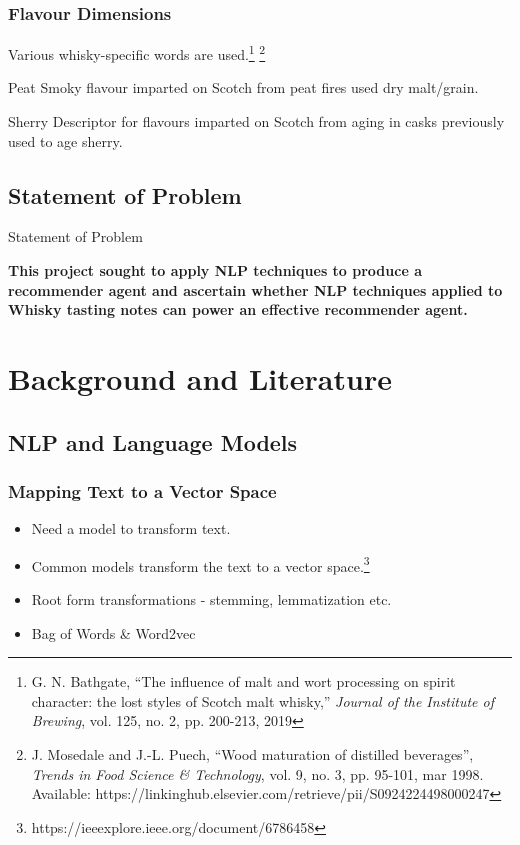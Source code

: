 \documentclass{beamer}
\begin{document}
\begin{frame}
    \frametitle{Flavour Dimensions}
    Various whisky-specific words are used.\footnote{
        G. N. Bathgate, ``The influence of malt and wort processing on spirit character: the lost styles of
    Scotch malt whisky,'' \emph{Journal of the Institute of Brewing}, vol. 125, no. 2, pp. 200-213, 2019}
    \footnote{J. Mosedale and J.-L. Puech, ``Wood maturation of distilled beverages'', \emph{Trends in
    Food Science \& Technology}, vol. 9, no. 3, pp. 95-101, mar 1998. Available:
    https://linkinghub.elsevier.com/retrieve/pii/S0924224498000247}
    
    \begin{block}{Peat}
    Smoky flavour imparted on Scotch from peat fires used dry malt/grain.
    \end{block}

    \begin{block}{Sherry}
    Descriptor for flavours imparted on Scotch from aging in casks previously used to age sherry.
    \end{block}
\end{frame}

\subsection{Statement of Problem}

\begin{frame}{Statement of Problem}

    \textbf{This project sought to apply NLP techniques to produce a recommender agent and ascertain whether
    NLP techniques applied to Whisky tasting notes can power an effective recommender agent.}
\end{frame}

\section{Background and Literature} 

\subsection{NLP and Language Models}

\begin{frame}
    \frametitle{Mapping Text to a Vector Space}
    \begin{itemize}
        \item Need a model to transform text.
        \item Common models transform the text to a vector space.\footnote{https://ieeexplore.ieee.org/document/6786458}
        \item Root form transformations - stemming, lemmatization etc.
        \item Bag of Words \& Word2vec
    \end{itemize}
\end{frame}
\end{document}
